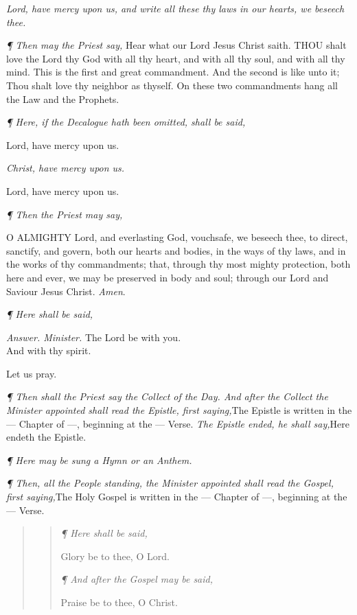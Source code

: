 \emph{Lord, have mercy upon us, and write all these
thy laws in our hearts, we beseech thee.}

\emph{¶
Then may the Priest say,}
Hear
what our Lord Jesus Christ saith.
THOU
shalt love the Lord thy God with all thy heart, and with all thy soul,
and with all thy mind. This is the first and great commandment. And the
second is like unto it; Thou shalt love thy neighbor as thyself. On these
two commandments hang all the Law and the Prophets.

\emph{¶
Here, if the Decalogue hath been omitted, shall be said,}

Lord,
have mercy upon us.

\emph{Christ, have mercy upon us.}

Lord, have mercy upon us.

\emph{¶ Then the Priest may say,}

O
ALMIGHTY Lord, and everlasting God, vouchsafe, we beseech thee, to direct,
sanctify, and govern, both our hearts and bodies, in the ways of thy laws,
and in the works of thy commandments; that, through thy most mighty protection,
both here and ever, we may be preserved in body and soul; through our
Lord and Saviour Jesus Christ. \emph{Amen}.

\emph{¶
Here shall be said,}

\emph{Answer. Minister.} The Lord be with
you. \\
And
with thy spirit. 

Let us pray.

\emph{¶
Then shall the Priest say the Collect of the Day. And after the Collect
the Minister appointed shall read the Epistle, first saying,}The
Epistle is written in the — Chapter of —, beginning at the
— Verse. \emph{The Epistle ended, he shall say,}Here endeth the
Epistle.

\emph{¶
Here may be sung a Hymn or an Anthem.}

\emph{¶
Then, all the People standing, the Minister appointed shall read the Gospel,
first saying,}\emph{}The Holy Gospel is written in the — Chapter of —, beginning
at the — Verse.

\begin{quote}

\begin{quote}

\emph{¶
Here shall be said,}

Glory
be to thee, O Lord.

\emph{¶ And after the Gospel may be said,}

Praise
be to thee, O Christ.

\end{quote}

\end{quote}

